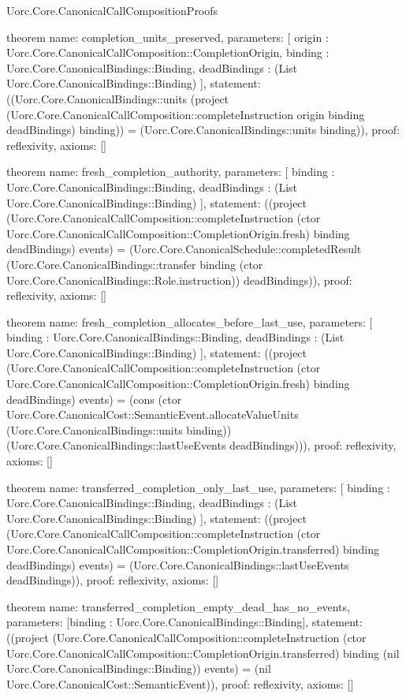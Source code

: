 \begin{lexlean}{Uorc.Core.CanonicalCallCompositionProofs}
\begin{semanticmodule}
theorem{
  name: completion_units_preserved,
  parameters: [
    origin : Uorc.Core.CanonicalCallComposition::CompletionOrigin,
    binding : Uorc.Core.CanonicalBindings::Binding,
    deadBindings : (List Uorc.Core.CanonicalBindings::Binding)
  ],
  statement: ((Uorc.Core.CanonicalBindings::units (project (Uorc.Core.CanonicalCallComposition::completeInstruction origin binding deadBindings) binding)) = (Uorc.Core.CanonicalBindings::units binding)),
  proof: reflexivity{},
  axioms: []
}

theorem{
  name: fresh_completion_authority,
  parameters: [
    binding : Uorc.Core.CanonicalBindings::Binding,
    deadBindings : (List Uorc.Core.CanonicalBindings::Binding)
  ],
  statement: ((project (Uorc.Core.CanonicalCallComposition::completeInstruction (ctor Uorc.Core.CanonicalCallComposition::CompletionOrigin.fresh) binding deadBindings) events) = (Uorc.Core.CanonicalSchedule::completedResult (Uorc.Core.CanonicalBindings::transfer binding (ctor Uorc.Core.CanonicalBindings::Role.instruction)) deadBindings)),
  proof: reflexivity{},
  axioms: []
}

theorem{
  name: fresh_completion_allocates_before_last_use,
  parameters: [
    binding : Uorc.Core.CanonicalBindings::Binding,
    deadBindings : (List Uorc.Core.CanonicalBindings::Binding)
  ],
  statement: ((project (Uorc.Core.CanonicalCallComposition::completeInstruction (ctor Uorc.Core.CanonicalCallComposition::CompletionOrigin.fresh) binding deadBindings) events) = (cons (ctor Uorc.Core.CanonicalCost::SemanticEvent.allocateValueUnits (Uorc.Core.CanonicalBindings::units binding)) (Uorc.Core.CanonicalBindings::lastUseEvents deadBindings))),
  proof: reflexivity{},
  axioms: []
}

theorem{
  name: transferred_completion_only_last_use,
  parameters: [
    binding : Uorc.Core.CanonicalBindings::Binding,
    deadBindings : (List Uorc.Core.CanonicalBindings::Binding)
  ],
  statement: ((project (Uorc.Core.CanonicalCallComposition::completeInstruction (ctor Uorc.Core.CanonicalCallComposition::CompletionOrigin.transferred) binding deadBindings) events) = (Uorc.Core.CanonicalBindings::lastUseEvents deadBindings)),
  proof: reflexivity{},
  axioms: []
}

theorem{
  name: transferred_completion_empty_dead_has_no_events,
  parameters: [binding : Uorc.Core.CanonicalBindings::Binding],
  statement: ((project (Uorc.Core.CanonicalCallComposition::completeInstruction (ctor Uorc.Core.CanonicalCallComposition::CompletionOrigin.transferred) binding (nil Uorc.Core.CanonicalBindings::Binding)) events) = (nil Uorc.Core.CanonicalCost::SemanticEvent)),
  proof: reflexivity{},
  axioms: []
}


\end{semanticmodule}
\end{lexlean}
